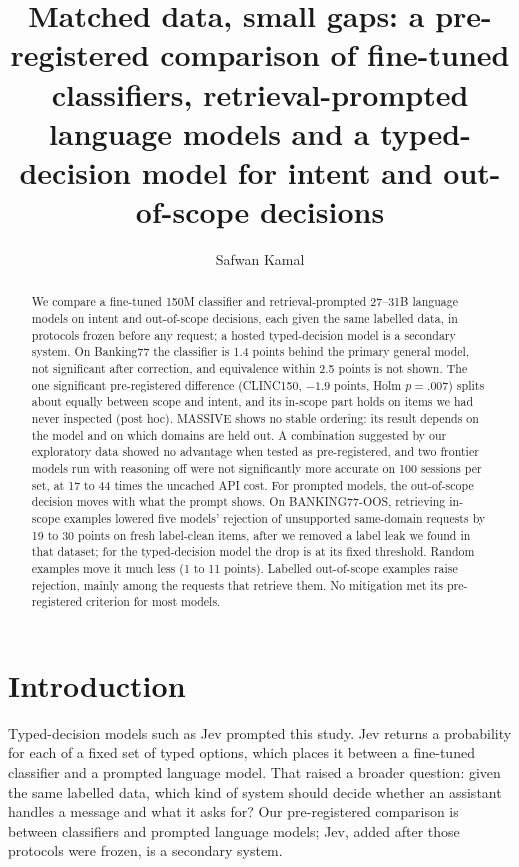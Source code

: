 \documentclass[11pt]{article}
\title{Matched data, small gaps: a pre-registered comparison of fine-tuned classifiers, retrieval-prompted language models and a typed-decision model for intent and out-of-scope decisions}
\author{Safwan Kamal}
\begin{document}
\maketitle
\begin{abstract}
We compare a fine-tuned 150M classifier and retrieval-prompted 27--31B language models on intent and out-of-scope decisions, each given the same labelled data, in protocols frozen before any request; a hosted typed-decision model is a secondary system. On Banking77 the classifier is 1.4 points behind the primary general model, not significant after correction, and equivalence within 2.5 points is not shown. The one significant pre-registered difference (CLINC150, $-1.9$ points, Holm $p=.007$) splits about equally between scope and intent, and its in-scope part holds on items we had never inspected (post hoc). MASSIVE shows no stable ordering: its result depends on the model and on which domains are held out. A combination suggested by our exploratory data showed no advantage when tested as pre-registered, and two frontier models run with reasoning off were not significantly more accurate on 100 sessions per set, at 17 to 44 times the uncached API cost. For prompted models, the out-of-scope decision moves with what the prompt shows. On BANKING77-OOS, retrieving in-scope examples lowered five models' rejection of unsupported same-domain requests by 19 to 30 points on fresh label-clean items, after we removed a label leak we found in that dataset; for the typed-decision model the drop is at its fixed threshold. Random examples move it much less (1 to 11 points). Labelled out-of-scope examples raise rejection, mainly among the requests that retrieve them. No mitigation met its pre-registered criterion for most models.
\end{abstract}

\section{Introduction}

Typed-decision models such as Jev \citep{deusser2026jev} prompted this study. Jev returns a probability for each of a fixed set of typed options, which places it between a fine-tuned classifier and a prompted language model. That raised a broader question: given the same labelled data, which kind of system should decide whether an assistant handles a message and what it asks for? Our pre-registered comparison is between classifiers and prompted language models; Jev, added after those protocols were frozen, is a secondary system.
\end{document}
